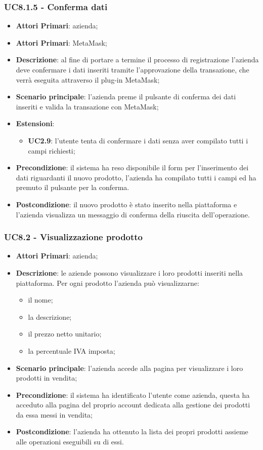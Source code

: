 \subsubsection{UC8.1.5 - Conferma dati}
\begin{itemize}
	\item \textbf{Attori Primari}: azienda;
	\item \textbf{Attori Primari}: MetaMask\glo;
	\item \textbf{Descrizione}: al fine di portare a termine il processo di registrazione l'azienda deve confermare i dati inseriti tramite l'approvazione della transazione, che verrà eseguita attraverso il plug-in MetaMask\glo;
	\item \textbf{Scenario principale}: l'azienda preme il pulsante di conferma dei dati inseriti e valida la transazione con MetaMask\glo;
	\item \textbf{Estensioni}:
	\begin{itemize}
		\item \textbf{UC2.9}: l'utente tenta di confermare i dati senza aver compilato tutti i campi richiesti;
	\end{itemize}
	\item \textbf{Precondizione}: il sistema ha reso disponibile il form per l'inserimento dei dati riguardanti il nuovo prodotto, l'azienda ha compilato tutti i campi ed ha premuto il pulsante per la conferma.
	\item \textbf{Postcondizione}: il nuovo prodotto è stato inserito nella piattaforma e l'azienda visualizza un messaggio di conferma della riuscita dell'operazione.
\end{itemize}

\subsubsection{UC8.2 - Visualizzazione prodotto}
\begin{itemize}
	\item \textbf{Attori Primari}: azienda;
	\item \textbf{Descrizione}: le aziende possono visualizzare i loro prodotti inseriti nella piattaforma. Per ogni prodotto l'azienda può visualizzarne:
	\begin{itemize}
		\item il nome;
		\item la descrizione;
		\item il prezzo netto unitario;
		\item la percentuale IVA imposta;
	\end{itemize}
	\item \textbf{Scenario principale}: l'azienda accede alla pagina per visualizzare i loro prodotti in vendita;	
	\item \textbf{Precondizione}: il sistema ha identificato l'utente come azienda, questa ha acceduto alla pagina del proprio account dedicata alla gestione dei prodotti da essa messi in vendita;
	\item \textbf{Postcondizione}: l'azienda ha ottenuto la lista dei propri prodotti assieme alle operazioni eseguibili su di essi.	
\end{itemize}

